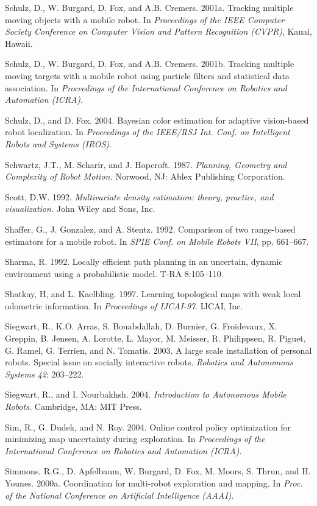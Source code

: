 \documentclass[10pt,a4paper]{article}
\begin{document}
Schulz, D., W. Burgard, D. Fox, and A.B. Cremers. 2001a. Tracking multiple moving
objects with a mobile robot. In \textit{Proceedings of the IEEE Computer Society Conference
on Computer Vision and Pattern Recognition (CVPR)}, Kauai, Hawaii.

Schulz, D., W. Burgard, D. Fox, and A.B. Cremers. 2001b. Tracking multiple moving
targets with a mobile robot using particle filters and statistical data association. In
\textit{Proceedings of the International Conference on Robotics and Automation (ICRA)}.

Schulz, D., and D. Fox. 2004. Bayesian color estimation for adaptive vision-based
robot localization. In \textit{Proceedings of the IEEE/RSJ Int. Conf. on Intelligent Robots and
Systems (IROS)}.

Schwartz, J.T., M. Scharir, and J. Hopcroft. 1987. \textit{Planning, Geometry and Complexity of
Robot Motion.} Norwood, NJ: Ablex Publishing Corporation.

Scott, D.W. 1992. \textit{Multivariate density estimation: theory, practice, and visualization.} John
Wiley and Sons, Inc.

Shaffer, G., J. Gonzalez, and A. Stentz. 1992. Comparison of two range-based estimators
for a mobile robot. In \textit{SPIE Conf. on Mobile Robots VII}, pp. 661–667.

Sharma, R. 1992. Locally efficient path planning in an uncertain, dynamic environment
using a probabilistic model. T-RA 8:105–110.

Shatkay, H, and L. Kaelbling. 1997. Learning topological maps with weak local odometric
information. In \textit{Proceedings of IJCAI-97}. IJCAI, Inc.

Siegwart, R., K.O. Arras, S. Bouabdallah, D. Burnier, G. Froidevaux, X. Greppin,
B. Jensen, A. Lorotte, L. Mayor, M. Meisser, R. Philippsen, R. Piguet, G. Ramel,
G. Terrien, and N. Tomatis. 2003. A large scale installation of personal robots.
Special issue on socially interactive robots. \textit{Robotics and Autonomous Systems 42}:
203–222.

Siegwart, R., and I. Nourbakhsh. 2004. \textit{Introduction to Autonomous Mobile Robots.}
Cambridge, MA: MIT Press.

Sim, R., G. Dudek, and N. Roy. 2004. Online control policy optimization for minimizing
map uncertainty during exploration. In \textit{Proceedings of the International Conference
on Robotics and Automation (ICRA)}.

Simmons, R.G., D. Apfelbaum, W. Burgard, D. Fox, M. Moors, S. Thrun, and
H. Younes. 2000a. Coordination for multi-robot exploration and mapping. In
\textit{Proc. of the National Conference on Artificial Intelligence (AAAI)}.
\end{document}
